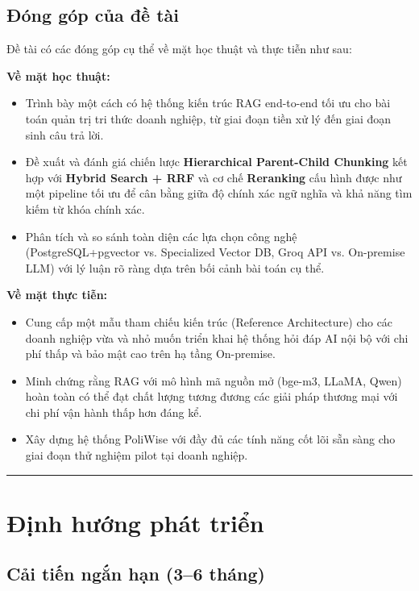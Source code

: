 \documentclass[12pt,a4paper]{report}
\begin{document}
\subsection{Đóng góp của đề tài}

Đề tài có các đóng góp cụ thể về mặt học thuật và thực tiễn như sau:

\textbf{Về mặt học thuật:}
\begin{itemize}
    \item Trình bày một cách có hệ thống kiến trúc RAG end-to-end tối ưu cho bài toán quản trị tri thức doanh nghiệp, từ giai đoạn tiền xử lý đến giai đoạn sinh câu trả lời.
    \item Đề xuất và đánh giá chiến lược \textbf{Hierarchical Parent-Child Chunking} kết hợp với \textbf{Hybrid Search + RRF} và cơ chế \textbf{Reranking} cấu hình được như một pipeline tối ưu để cân bằng giữa độ chính xác ngữ nghĩa và khả năng tìm kiếm từ khóa chính xác.
    \item Phân tích và so sánh toàn diện các lựa chọn công nghệ (PostgreSQL+pgvector vs. Specialized Vector DB, Groq API vs. On-premise LLM) với lý luận rõ ràng dựa trên bối cảnh bài toán cụ thể.
\end{itemize}

\textbf{Về mặt thực tiễn:}
\begin{itemize}
    \item Cung cấp một mẫu tham chiếu kiến trúc (Reference Architecture) cho các doanh nghiệp vừa và nhỏ muốn triển khai hệ thống hỏi đáp AI nội bộ với chi phí thấp và bảo mật cao trên hạ tầng On-premise.
    \item Minh chứng rằng RAG với mô hình mã nguồn mở (bge-m3, LLaMA, Qwen) hoàn toàn có thể đạt chất lượng tương đương các giải pháp thương mại với chi phí vận hành thấp hơn đáng kể.
    \item Xây dựng hệ thống PoliWise với đầy đủ các tính năng cốt lõi sẵn sàng cho giai đoạn thử nghiệm pilot tại doanh nghiệp.
\end{itemize}

\rule{\textwidth}{0.5pt}

\section{Định hướng phát triển}

\subsection{Cải tiến ngắn hạn (3--6 tháng)}
\end{document}
